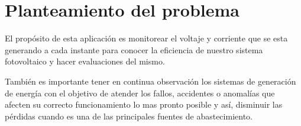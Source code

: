 
\section{Planteamiento del problema}
El propósito de esta aplicación es monitorear el voltaje y corriente que se esta generando a cada instante para conocer la eficiencia de nuestro sistema fotovoltaico y hacer evaluaciones del mismo.

También es importante tener en continua observación los sistemas de generación de energía con el objetivo de atender los fallos, accidentes o anomalías que afecten su correcto funcionamiento lo mas pronto posible y así, disminuir las pérdidas cuando es una de las principales fuentes de abastecimiento.

